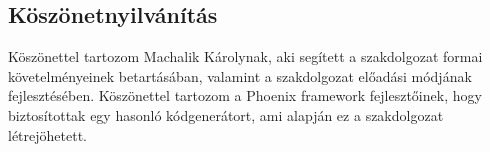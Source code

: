 \begin{center}
\section*{Köszönetnyilvánítás}
\end{center}

Köszönettel tartozom Machalik Károlynak, aki segített a szakdolgozat formai követelményeinek betartásában, valamint a szakdolgozat előadási módjának fejlesztésében. Köszönettel tartozom a Phoenix framework fejlesztőinek, hogy biztosítottak egy hasonló kódgenerátort, ami alapján ez a szakdolgozat létrejöhetett.
